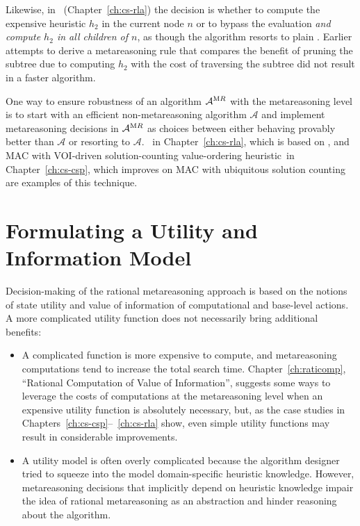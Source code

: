 Likewise, in \rationallazyastar~(Chapter~\ref{ch:cs-rla}) the
decision is whether to compute the expensive heuristic $h_2$ in the current
node $n$ or to bypass the evaluation \emph{and compute $h_2$ in all
  children of $n$}, as though the algorithm resorts to plain \lazyastar.
Earlier attempts to derive a metareasoning rule that compares the
benefit of pruning the subtree due to computing $h_2$ 
with the cost of traversing the subtree did not result in a faster
algorithm. 

One way to ensure robustness of an algorithm ${\mathcal A}^{\textrm MR}$ with the
metareasoning level is to start with an efficient non-metareasoning
algorithm ${\mathcal A}$ and implement metareasoning decisions in ${\mathcal
A}^{\textrm MR}$ as choices
between either behaving provably better than ${\mathcal A}$ or
resorting to ${\mathcal A}$.
\rationallazyastar~in Chapter~\ref{ch:cs-rla}, which is based on
\lazyastar, and MAC with VOI-driven solution-counting value-ordering
heuristic~in Chapter~\ref{ch:cs-csp}, which improves on MAC with
ubiquitous solution counting are examples of this technique.

\section{Formulating a Utility and Information Model}

Decision-making of the rational metareasoning approach is based on the
notions of state utility and value of information of computational and
base-level actions. A more complicated utility function does not necessarily
bring additional  benefits:
\begin{itemize}
\item A complicated function is more expensive to compute, and
  metareasoning computations tend to increase the total search
  time.  Chapter~\ref{ch:raticomp}, ``Rational Computation of Value of
  Information'', suggests some ways to leverage the costs of
  computations at the metareasoning level when an expensive utility
  function is absolutely necessary, but, as the case studies in
  Chapters~\ref{ch:cs-csp}--~\ref{ch:cs-rla} show, even simple utility
  functions may result in considerable improvements.
\item A utility model is often overly complicated because the
  algorithm designer tried to squeeze into the model domain-specific
  heuristic knowledge. However, metareasoning decisions
  that implicitly depend on heuristic knowledge impair the idea of
  rational metareasoning as an abstraction and hinder reasoning about
  the algorithm.
\end{itemize}

